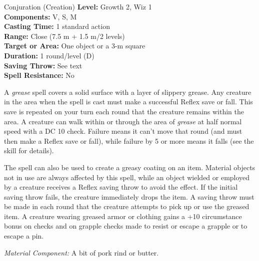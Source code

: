 {Conjuration (Creation)}
{
	\textbf{Level:}
	Growth 2, Wiz 1\\
	\textbf{Components:}
	V, S, M\\
	\textbf{Casting Time:}
	1 standard action\\
	\textbf{Range:}
	Close (7.5 m + 1.5 m/2 levels)\\
	\textbf{Target or Area:}
	One object or a 3-m square\\
	\textbf{Duration:}
	1 round/level (D)\\
	\textbf{Saving Throw:}
	See text\\
	\textbf{Spell Resistance:}
	No\\
}
{
	A \emph{grease} spell covers a solid surface with a layer of slippery grease. Any creature in the area when the spell is cast must make a successful Reflex save or fall. This save is repeated on your turn each round that the creature remains within the area. A creature can walk within or through the area of \emph{grease} at half normal speed with a DC 10  check. Failure means it can't move that round (and must then make a Reflex save or fall), while failure by 5 or more means it falls (see the  skill for details).

	The spell can also be used to create a greasy coating on an item. Material objects not in use are always affected by this spell, while an object wielded or employed by a creature receives a Reflex saving throw to avoid the effect. If the initial saving throw fails, the creature immediately drops the item. A saving throw must be made in each round that the creature attempts to pick up or use the greased item. A creature wearing greased armor or clothing gains a +10 circumstance bonus on  checks and on grapple checks made to resist or escape a grapple or to escape a pin.

	\textit{Material Component:}
	A bit of pork rind or butter.

}
